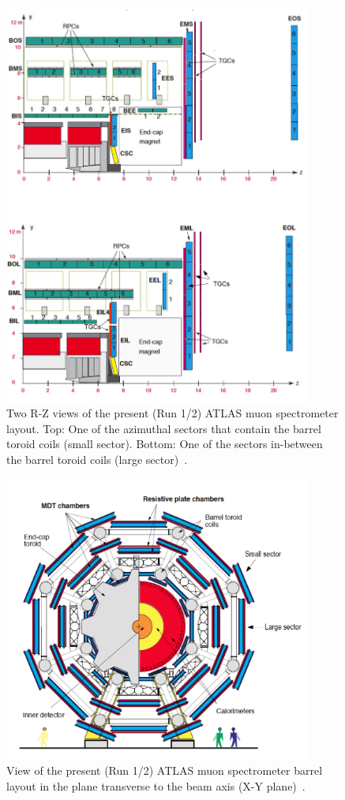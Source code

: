 \begin{figure}[!h]
	\centering
	\includegraphics[width=0.9\textwidth]{Chapters/CH3/figures/MS_rz}
	\caption{Two R-Z views of the present (Run 1/2) ATLAS muon spectrometer layout. Top: One of the azimuthal sectors that contain the barrel toroid coils (small sector). Bottom: One of the sectors in-between the barrel toroid coils (large sector)~\cite{TDR}.}
	\label{fig:MS_rz}
\end{figure}
\begin{figure}[!h]
	\centering
	\includegraphics[width=0.9\textwidth]{Chapters/CH3/figures/MS_xy}
	\caption{View of the present (Run 1/2) ATLAS muon spectrometer barrel layout in the plane transverse to the beam axis (X-Y plane)~\cite{TDR}.}
	\label{fig:MS_xy2}
\end{figure}
